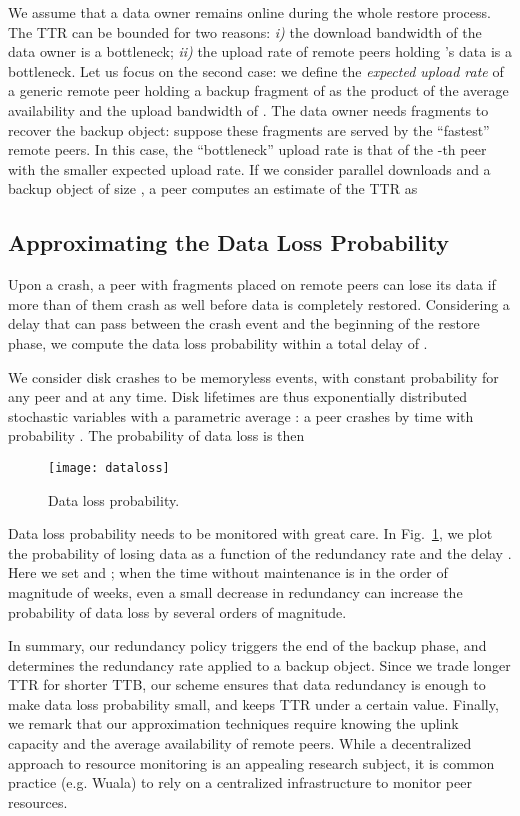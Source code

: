 \documentclass[conference,10pt]{IEEEtran}
\begin{document}
We assume that a data owner  remains online during the whole restore process. The TTR can be bounded for two reasons: \emph{i)} the download bandwidth  of the data owner is a bottleneck; \emph{ii)} the upload rate of remote peers holding 's data is a bottleneck.
Let us focus on the second case: we define the \emph{expected upload rate} of a generic remote peer  holding a backup fragment of  as the product  of the average availability and the upload bandwidth of . 
The data owner needs  fragments to recover the backup object: suppose these fragments are served by the  ``fastest'' remote peers. In this case, the ``bottleneck'' upload rate is that of the -th peer  with the smaller expected upload rate.
If we consider  parallel downloads and a backup object of size , a peer computes an estimate of the TTR as



\subsection{Approximating the Data Loss Probability}
\label{sec:dataloss}

Upon a crash, a peer with  fragments placed on remote peers can lose its data if more than  of them crash as well before data is completely restored. Considering a delay  that can pass between the crash event and the beginning of the restore phase, we compute the data loss probability within a total delay of .

We consider disk crashes to be memoryless events, with constant probability for any peer and at any time. Disk lifetimes are thus exponentially distributed stochastic variables with a parametric average : a peer crashes by time  with probability . The probability of data loss is then


\begin{figure}
\centering
\texttt{[image: dataloss]}
\caption{Data loss probability.}
\label{fig:dataloss}
\end{figure}

Data loss probability needs to be monitored with great care. In Fig.~\ref{fig:dataloss}, we plot the probability of losing data as a function of the redundancy rate and the delay . Here we set  and ; when the time without maintenance is in the order of magnitude of weeks, even a small decrease in redundancy can increase the probability of data loss by several orders of magnitude.


In summary, our redundancy policy triggers the end of the backup phase, and determines the redundancy rate applied to a backup object. Since we trade longer TTR for shorter TTB, our scheme ensures that data redundancy is enough to make data loss probability small, and keeps TTR under a certain value.
Finally, we remark that our approximation techniques require knowing the uplink capacity and the average availability of remote peers. While a decentralized approach to resource monitoring is an appealing research subject, it is common practice (e.g. Wuala) to rely on a centralized infrastructure to monitor peer resources.
\end{document}
